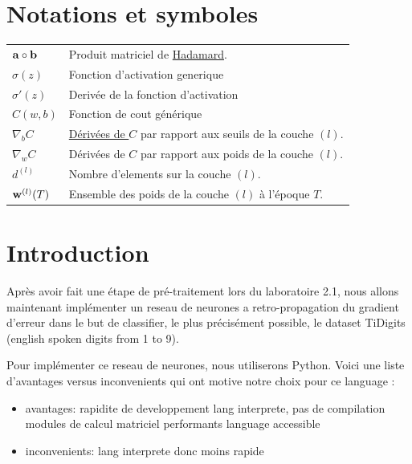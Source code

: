 \documentclass[11pt]{article}
\date{}
\begin{document}
\def \ETScourse {ELE778-01 - Intelligence artificielle: réseaux neuroniques
et systèmes experts}
\def \ETStitle {Laboratoire 2}
\def \ETSprof  {Cynthia \textsc{Moussa}}
\def \ETSauthA {Liam \textsc{Beguin}\\\emph{BEGL02129304}}
\def \ETSauthB {Louis \textsc{Laporte}\\\emph{LAPL14128903}}



\section{Notations et symboles}
\begin{tabular}{p{1.75cm}p{10cm}}
	${\bf a} \circ {\bf b}$ & Produit matriciel de
	\href{https://en.wikipedia.org/wiki/Hadamard_product_(matrices)}{Hadamard}. \\

	$\sigma(z)$ & Fonction d'activation generique \\
	$\sigma'(z)$ & Deriv\'ee de la fonction d'activation \\
	$C(w, b)$ & Fonction de cout g\'en\'erique \\
	$\nabla_bC$ & \href{https://en.wikipedia.org/wiki/Matrix_calculus}
	{D\'eriv\'ees de $C$} par rapport aux seuils de la couche $(l)$. \\
	$\nabla_wC$ & D\'eriv\'ees de $C$ par rapport aux poids de la couche $(l)$. \\
	$d^{(l)}$ & Nombre d'elements sur la couche $(l)$. \\
	${\bf w}^{(l)}(T)$ & Ensemble des poids de la couche $(l)$ \`a l'\'epoque $T$. \\
\end{tabular}
\newpage



\section{Introduction}
Après avoir fait une étape de pré-traitement lors du laboratoire 2.1, nous
allons maintenant implémenter un reseau de neurones a retro-propagation du
gradient d’erreur dans le but de classifier, le plus précisément possible,
le dataset TiDigits (english spoken digits from 1 to 9).

Pour implémenter ce reseau de neurones, nous utiliserons Python.
Voici une liste d'avantages versus inconvenients qui ont motive notre choix
pour ce language :
\begin{itemize}
	\item avantages:
		\subitem rapidite de developpement
		\subitem lang interprete, pas de compilation
		\subitem modules de calcul matriciel performants
		\subitem language accessible
	\item inconvenients:
		\subitem lang interprete donc moins rapide \\
\end{itemize}
\end{document}
